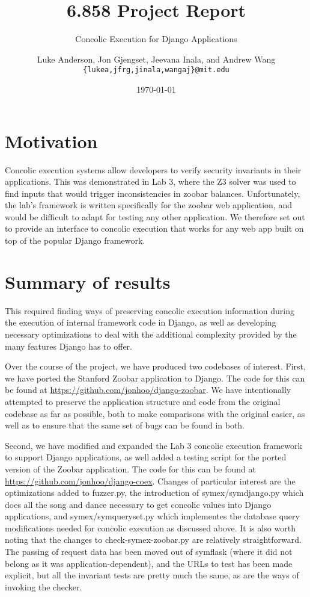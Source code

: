 \documentclass{scrartcl}
\author{
Luke Anderson, Jon Gjengset, Jeevana Inala, and Andrew Wang \\
\texttt{\{lukea,jfrg,jinala,wangaj\}@mit.edu}
}
\title{6.858 Project Report}
\subtitle{Concolic Execution for Django Applications}
\date{\today}
\begin{document}
\maketitle

\section{Motivation}
Concolic execution systems allow developers to verify security
invariants in their applications. This was demonstrated in Lab 3, where
the Z3 solver was used to find inputs that would trigger inconsistencies
in zoobar balances. Unfortunately, the lab's framework is written
specifically for the zoobar web application, and would be difficult to
adapt for testing any other application. We therefore set out to provide
an interface to concolic execution that works for any web app built on top
of the popular Django framework.


\section{Summary of results}
This required finding ways of preserving concolic execution information during
the execution of internal framework code in Django, as well as developing
necessary optimizations to deal with the additional complexity provided by the
many features Django has to offer.

Over the course of the project, we have produced two codebases of interest.
First, we have ported the Stanford Zoobar application to Django. The code for
this can be found at \url{https://github.com/jonhoo/django-zoobar}. We have
intentionally attempted to preserve the application structure and code from the
original codebase as far as possible, both to make comparisons with the
original easier, as well as to ensure that the same set of bugs can be found in
both.

Second, we have modified and expanded the Lab 3 concolic execution framework to
support Django applications, as well added a testing script for the ported
version of the Zoobar application. The code for this can be found at
\url{https://github.com/jonhoo/django-coex}. Changes of particular interest are
the optimizations added to fuzzer.py, the introduction of symex/symdjango.py
which does all the song and dance necessary to get concolic values into Django
applications, and symex/symqueryset.py which implementes the database query
modifications needed for concolic execution as discussed above. It is also
worth noting that the changes to check-symex-zoobar.py are relatively
straightforward. The passing of request data has been moved out of symflask
(where it did not belong as it was application-dependent), and the URLs to test
has been made explicit, but all the invariant tests are pretty much the same,
as are the ways of invoking the checker.
\end{document}
